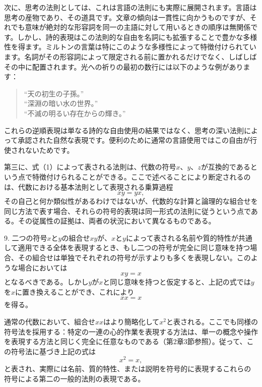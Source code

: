 \documentclass[a4paper,11pt,openany]{ltjsbook}
\begin{document}
次に、思考の法則としては、これは言語の法則にも実際に展開されます。言語は思考の産物であり、その道具です。文章の傾向は一貫性に向かうものですが、それでも意味が絶対的な形容詞を同一の主語に対して用いるときの順序は無関係です。しかし、詩的表現はこの法則的な自由を名詞にも拡張することで豊かな多様性を得ます。ミルトンの言葉は特にこのような多様性によって特徴付けられています。名詞がその形容詞によって限定される前に置かれるだけでなく、しばしばその中に配置されます。光への祈りの最初の数行には以下のような例があります：
\begin{verse}
``天の初生の子孫。''\\
``深淵の暗い水の世界。''\\
``不滅の明るい存在からの輝き。''
\end{verse}

これらの逆順表現は単なる詩的な自由使用の結果ではなく、思考の深い法則によって承認された自然な表現です。便利のために通常の言語使用ではこの自由が行使されないためです。

第三に、式（1）によって表される法則は、代数の符号$x$、$y$、$z$が互換的であるという点で特徴付けられることができる。ここで述べることにより断定されるのは、代数における基本法則として表現される乗算過程
\[
xy = yx,
\]
その自己と何か類似性があるわけではないが、代数的な計算と論理的な組合せを同じ方法で表す場合、それらの符号的表現は同一形式の法則に従うという点である。その従属性の証拠は、両者の状況において異なるものである。

9. 二つの符号$x$と$y$の組合せ$x y$が、$x$と$y$によって表される名前や質的特性が共通して適用できる全体を表現するとき、もし二つの符号が完全に同じ意味を持つ場合、その組合せは単独でそれぞれの符号が示すよりも多くを表現しない。このような場合においては
\[
xy = x
\]
となるべきである。しかし$y$が$x$と同じ意味を持つと仮定すると、上記の式では$y$を$x$に置き換えることができ、これにより
\[
xx = x
\]
を得る。

通常の代数において、組合せ$xx$はより簡略化して$x^2$と表される。ここでも同様の符号法を採用する：特定の一連の心的作業を表現する方法は、単一の概念や操作を表現する方法と同じく完全に任意なものである（第2章3節参照）。従って、この符号法に基づき上記の式は
\begin{equation}
x^2 = x,
\end{equation}
と表され、実際には名前、質的特性、または説明を符号的に表現するこれらの符号による第二の一般的法則の表現である。
\end{document}
